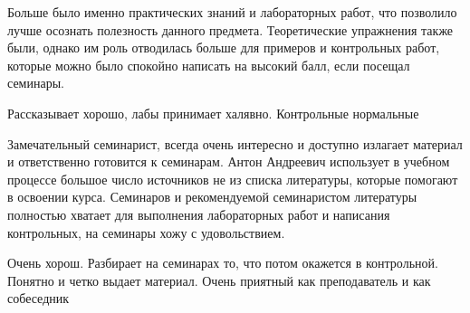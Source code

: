             \begin{commentbox} 
                Больше было именно практических знаний и лабораторных работ, что позволило лучше осознать полезность данного предмета. Теоретические упражнения также были, однако им роль отводилась больше для примеров и контрольных работ, которые можно было спокойно написать на высокий балл, если посещал семинары. 
            \end{commentbox} 
        
            \begin{commentbox} 
                Рассказывает хорошо, лабы принимает халявно. Контрольные нормальные  
            \end{commentbox} 
        
            \begin{commentbox} 
                Замечательный семинарист, всегда очень интересно и доступно излагает материал и ответственно готовится к семинарам. Антон Андреевич использует в учебном процессе большое число источников не из списка литературы, которые помогают в освоении курса. Семинаров и рекомендуемой семинаристом литературы полностью хватает для выполнения лабораторных работ и написания контрольных, на семинары хожу с удовольствием. 
            \end{commentbox} 
        
            \begin{commentbox} 
                Очень хорош. Разбирает на семинарах то, что потом окажется в контрольной. Понятно и четко выдает материал. Очень приятный как преподаватель и как собеседник 
            \end{commentbox}


